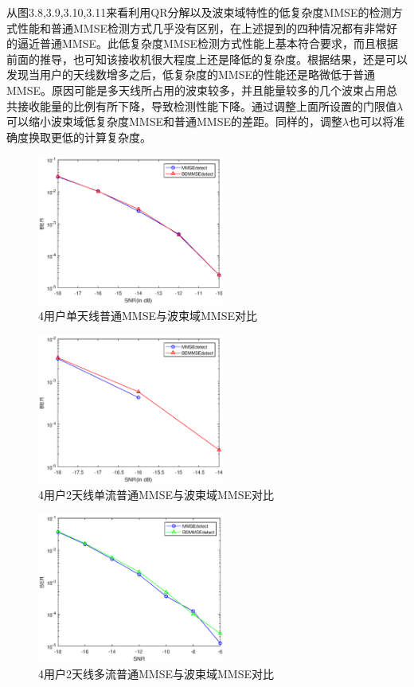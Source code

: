 \documentclass[bachelor,nocolorlinks, printoneside]{seuthesis} %
\begin{document}
\begin{Main}
从图3.8,3.9,3.10,3.11来看利用QR分解以及波束域特性的低复杂度MMSE的检测方式性能和普通MMSE检测方式几乎没有区别，在上述提到的四种情况都有非常好的逼近普通MMSE。此低复杂度MMSE检测方式性能上基本符合要求，而且根据前面的推导，也可知该接收机很大程度上还是降低的复杂度。根据结果，还是可以发现当用户的天线数增多之后，低复杂度的MMSE的性能还是略微低于普通MMSE。原因可能是多天线所占用的波束较多，并且能量较多的几个波束占用总共接收能量的比例有所下降，导致检测性能下降。通过调整上面所设置的门限值$\lambda$可以缩小波束域低复杂度MMSE和普通MMSE的差距。同样的，调整$\lambda$也可以将准确度换取更低的计算复杂度。

\begin{figure}[htbp!]
	\centering \includegraphics[width=0.55\textwidth]{img/3_4.eps} \caption{4用户单天线普通MMSE与波束域MMSE对比}
\end{figure}
\begin{figure}[htbp!]
	\centering \includegraphics[width=0.55\textwidth]{img/3_5.eps} \caption{4用户2天线单流普通MMSE与波束域MMSE对比}
\end{figure}
\begin{figure}[htbp!]
	\centering \includegraphics[width=0.55\textwidth]{img/3_6.eps} \caption{4用户2天线多流普通MMSE与波束域MMSE对比}

\end{figure}
\end{Main}
\end{document}
